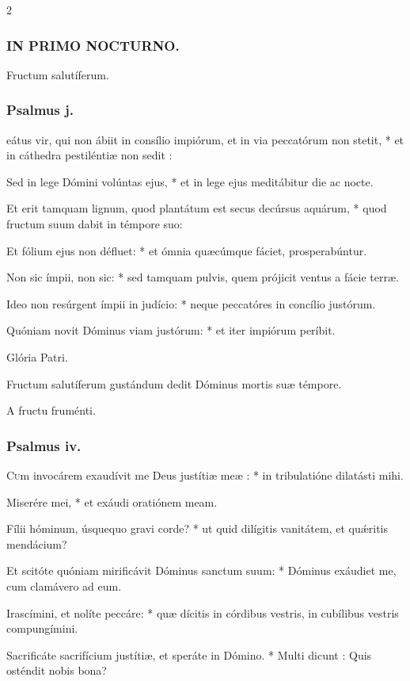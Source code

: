 \documentclass[9pt,twoside]{extarticle}
\begin{document}
\begin{multicols}{2}
\subsubsection*{\center \textsc{IN PRIMO NOCTURNO.}}
 Fructum salutíferum.
\subsubsection*{\center Psalmus j.}
eátus vir, qui non ábiit in consílio impiórum, et in via peccatórum non stetit, * et in cáthedra pestiléntiæ non sedit :

Sed in lege Dómini volúntas ejus, * et in lege ejus meditábitur die ac nocte.

Et erit tamquam lignum, quod plantátum est secus decúrsus aquárum, * quod fructum suum dabit in témpore suo:

Et fólium ejus non défluet: * et ómnia quæcúmque fáciet, prosperabúntur.

Non sic ímpii, non sic: * sed tamquam pulvis, quem prójicit ventus a fácie terræ.

Ideo non resúrgent ímpii in judício: * neque peccatóres in concílio justórum.

Quóniam novit Dóminus viam justórum: * et iter impiórum períbit.

Glória Patri.

\begin{tightlist}{}
\item {} Fructum salutíferum gustándum dedit Dóminus mortis suæ témpore.
\item {} A fructu fruménti.
\end{tightlist}

\subsubsection*{\center Psalmus iv.}
\lettrine{C}um invocárem exaudívit me Deus justítiæ meæ : * in tribulatióne dilatásti mihi.

Miserére mei, * et exáudi oratiónem meam.

Fílii hóminum, úsquequo gravi corde? * ut quid dilígitis vanitátem, et quǽritis mendácium?

Et scitóte quóniam mirificávit Dóminus sanctum suum: * Dóminus exáudiet me, cum clamávero ad eum.

Irascímini, et nolíte peccáre: * quæ dícitis in córdibus vestris, in cubílibus vestris compungímini.

Sacrificáte sacrifícium justítiæ, et speráte in Dómino. * Multi dicunt : Quis osténdit nobis bona?


\end{multicols}
\end{document}
